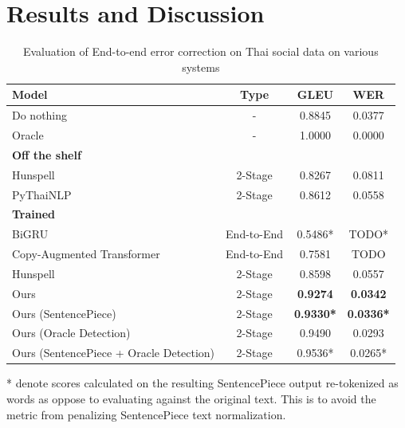 
\section{Results and Discussion}

\begin{table}
  \caption{Evaluation of End-to-end error correction on Thai social data on various systems}
  \begin{threeparttable}
  \begin{tabular}{lccc}
    \toprule
    Model & Type & GLEU & WER \\
    \midrule
    Do nothing & - & 0.8845 & 0.0377 \\
    Oracle & - & 1.0000 & 0.0000 \\
    \midrule
    \textbf{Off the shelf} & \\
    Hunspell & 2-Stage & 0.8267 & 0.0811 \\
    PyThaiNLP & 2-Stage & 0.8612 & 0.0558 \\
    \midrule
    \textbf{Trained} & \\
    BiGRU & End-to-End & 0.5486* & TODO* \\
    Copy-Augmented Transformer & End-to-End & 0.7581 & TODO \\
    Hunspell & 2-Stage & 0.8598 & 0.0557 \\
    \midrule
    Ours & 2-Stage & \textbf{0.9274} & \textbf{0.0342} \\
    Ours (SentencePiece) & 2-Stage & \textbf{0.9330*} & \textbf{0.0336*} \\
    Ours (Oracle Detection) & 2-Stage & 0.9490 & 0.0293 \\
    Ours (SentencePiece + Oracle Detection) & 2-Stage & 0.9536* & 0.0265* \\
    \bottomrule
  \end{tabular}
  \begin{tablenotes}\footnotesize
    \item[*] denote scores calculated on the resulting SentencePiece output re-tokenized as words as oppose to evaluating against the original text. This is to avoid the metric from penalizing SentencePiece text normalization.
  \end{tablenotes}
  \end{threeparttable}
  \label{tab:e2e_ugwc}
\end{table}

